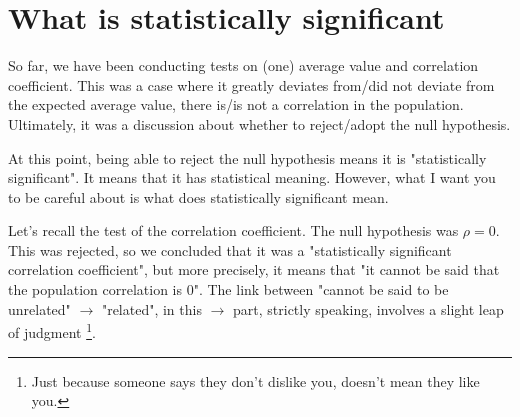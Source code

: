\documentclass{ltjsbook}
\begin{document}
\section{What is statistically significant}
\label{statistical_significant}
So far, we have been conducting tests on (one) average value and correlation coefficient.
This was a case where it greatly deviates from/did not deviate from the expected average value, there is/is not a correlation in the population. Ultimately, it was a discussion about whether to reject/adopt the null hypothesis.

At this point, being able to reject the null hypothesis means it is "statistically significant". It means that it has statistical meaning. However, what I want you to be careful about is what does statistically significant mean.

Let's recall the test of the correlation coefficient. The null hypothesis was $\rho=0$. This was rejected, so we concluded that it was a "statistically significant correlation coefficient", but more precisely, it means that "it cannot be said that the population correlation is 0". The link between "cannot be said to be unrelated" $\to$ "related", in this $\to$ part, strictly speaking, involves a slight leap of judgment \footnote{Just because someone says they don't dislike you, doesn't mean they like you.}.
\end{document}
